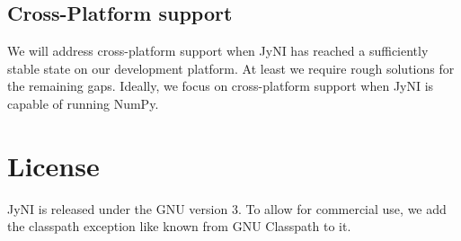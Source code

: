 \documentclass[letterpaper,compsoc,twoside]{IEEEtran}
\begin{document}
\subsection{Cross-Platform support\label{cross-platform-support}}


We will address cross-platform support when JyNI has reached a sufficiently stable state on our development platform.
At least we require rough solutions for the remaining gaps. Ideally, we focus
on cross-platform support when JyNI is capable of running NumPy.

\section{License\label{license}}


JyNI is released under the GNU \cite{GPL} version 3.
To allow for commercial use, we add the classpath exception \cite{GPL_EXC} like known from GNU Classpath to it.
\end{document}
